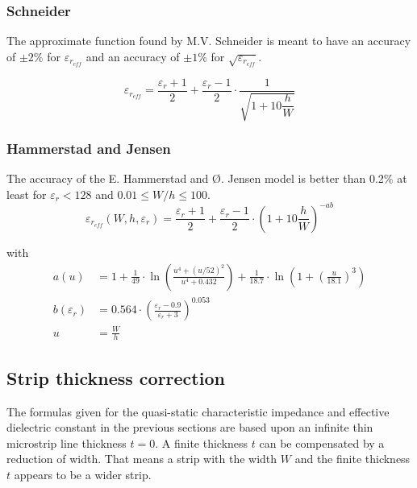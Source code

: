 \subsubsection{Schneider}

The approximate function found by M.V. Schneider \cite{Schneider} is
meant to have an accuracy of $\pm 2\%$ for $\varepsilon_{r_{eff}}$ and
an accuracy of $\pm 1\%$ for $\sqrt{\varepsilon_{r_{eff}}}$.

\begin{equation}
\varepsilon_{r_{eff}} = \dfrac{\varepsilon_{r} + 1}{2} + \dfrac{\varepsilon_{r} - 1}{2}\cdot\dfrac{1}{\sqrt{1 + 10\dfrac{h}{W}}}
\end{equation}

\subsubsection{Hammerstad and Jensen}

The accuracy of the E. Hammerstad and {\O}. Jensen \cite{Hammerstad} model
is better than 0.2\% at least for $\varepsilon_r < 128$ and $0.01 \le
W/h \le 100$.
\begin{equation}
\label{eq:HandJErEff}
\varepsilon_{r_{eff}}\left(W, h, \varepsilon_r\right) = \frac{\varepsilon_{r} + 1}{2} + \frac{\varepsilon_{r} - 1}{2}\cdot\left(1 + 10\frac{h}{W}\right)^{-ab}
\end{equation}

with
\begin{align}
\label{eq:HandJa}
a\left(u\right) &= 1 + \frac{1}{49}\cdot\ln{\left(\frac{u^{4} + \left(u/52\right)^{2}}{u^{4} + 0.432}\right)} + \frac{1}{18.7}\cdot\ln{\left(1 + \left(\frac{u}{18.1}\right)^{3}\right)}\\
\label{eq:HandJb}
b\left(\varepsilon_r\right) &= 0.564\cdot\left(\frac{\varepsilon_{r} - 0.9}{\varepsilon_{r} + 3}\right)^{0.053}\\
u &= \frac{W}{h}
\end{align}

\subsection{Strip thickness correction}

The formulas given for the quasi-static characteristic impedance and
effective dielectric constant in the previous sections are based upon
an infinite thin microstrip line thickness $t = 0$.  A finite
thickness $t$ can be compensated by a reduction of width.  That means
a strip with the width $W$ and the finite thickness $t$ appears to be
a wider strip.

